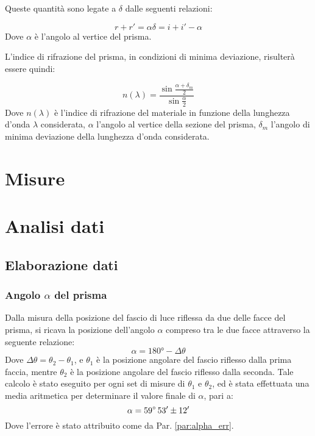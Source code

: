 \documentclass[]{article}
\let\oldsection\section%
\renewcommand{\section}{%
	\renewcommand{\theequation}{\thesection.\arabic{equation}}%
	\oldsection}%
\let\oldsubsection\subsection%
\renewcommand{\subsection}{%
	\renewcommand{\theequation}{\thesubsection.\arabic{equation}}%
	\oldsubsection}%
\begin{document}
    Queste quantità sono legate a $\delta$ dalle seguenti relazioni:

    \begin{equation}
        \label{relazioni_delta}
        r + r' = \alpha
        \delta = i + i' - \alpha
    \end{equation}
    Dove $\alpha$ è l'angolo al vertice del prisma.

    L'indice di rifrazione del prisma, in condizioni di minima deviazione, risulterà essere quindi:

    \begin{equation}
        \label{indice_rifrazione}
        n(\lambda)=\frac{\sin \frac{\alpha + \delta _m} {2}}{\sin \frac{\alpha}{2}}
    \end{equation}
    Dove $n(\lambda)$ è l'indice di rifrazione del materiale in funzione della lunghezza d'onda $\lambda$ considerata, $\alpha$ l'angolo al vertice della sezione del prisma, $\delta _m $ l'angolo di minima deviazione della lunghezza d'onda considerata.

    \section{Misure}

    \section{Analisi dati}
    \subsection{Elaborazione dati}
    \subsubsection{Angolo $\alpha$ del prisma}
    Dalla misura della posizione del fascio di luce riflessa da due delle facce del prisma, si ricava la posizione dell'angolo $\alpha$ compreso tra le due facce attraverso la seguente relazione:
    \begin{equation}
        \label{alpha}
        \alpha = 180° - \Delta\theta
    \end{equation}
    Dove $\Delta\theta=\theta_2-\theta_1$, e $\theta_1$ è la posizione angolare del fascio riflesso dalla prima faccia, mentre $\theta_2$ è la posizione angolare del fascio riflesso dalla seconda.
    Tale calcolo è stato eseguito per ogni set di misure di $\theta_1$ e $\theta_2$, ed è stata effettuata una media aritmetica per determinare il valore finale di $\alpha$, pari a: 
    \begin{equation}
        \label{alpha-value}
        \alpha = 59 \degree \, 53' \pm 12'
    \end{equation}
    Dove l'errore è stato attribuito come da Par. \ref{par:alpha_err}.
\end{document}
